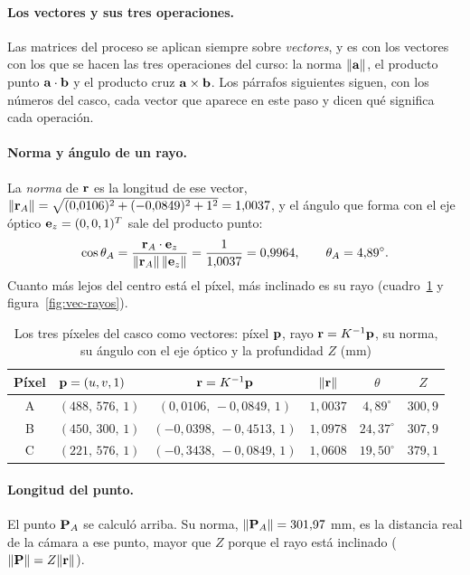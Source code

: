 \paragraph{Los vectores y sus tres operaciones.} Las matrices del proceso se aplican siempre sobre \emph{vectores}, y es con los vectores con los que se hacen las tres operaciones del curso: la norma $\lVert\mathbf{a}\rVert$, el producto punto $\mathbf{a}\cdot\mathbf{b}$ y el producto cruz $\mathbf{a}\times\mathbf{b}$. Los párrafos siguientes siguen, con los números del casco, cada vector que aparece en este paso y dicen qué significa cada operación.

\paragraph{Norma y ángulo de un rayo.} La \emph{norma} de $\mathbf{r}$ es la longitud de ese vector, $\lVert\mathbf{r}_A\rVert=\sqrt{(0{,}0106)^2+(-0{,}0849)^2+1^2}=1{,}0037$, y el ángulo
que forma con el eje óptico $\mathbf{e}_z=(0,0,1)^{T}$ sale del producto punto:
\begin{equation}
\cos\theta_A=\frac{\mathbf{r}_A\cdot\mathbf{e}_z}{\lVert\mathbf{r}_A\rVert\,\lVert\mathbf{e}_z\rVert}=\frac{1}{1{,}0037}=0{,}9964,\qquad \theta_A=4{,}89^\circ .
\end{equation}
Cuanto más lejos del centro está el píxel, más inclinado es su rayo (cuadro~\ref{tab:rayos-casco} y figura~\ref{fig:vec-rayos}).

\begin{table}[htbp]
\caption{Los tres píxeles del casco como vectores: píxel $\mathbf{p}$, rayo $\mathbf{r}=K^{-1}\mathbf{p}$, su norma, su ángulo con el eje óptico y la profundidad $Z$ (mm)}
\label{tab:rayos-casco}
\centering\small
\begin{tabular}{@{}clcccc@{}}
\toprule
Píxel & $\mathbf{p}=(u,v,1)$ & $\mathbf{r}=K^{-1}\mathbf{p}$ & $\lVert\mathbf{r}\rVert$ & $\theta$ & $Z$ \\
\midrule
A & $(488,\,576,\,1)$ & $(0{,}0106,\,-0{,}0849,\,1)$ & $1{,}0037$ & $4{,}89^\circ$ & $300{,}9$ \\
B & $(450,\,300,\,1)$ & $(-0{,}0398,\,-0{,}4513,\,1)$ & $1{,}0978$ & $24{,}37^\circ$ & $307{,}9$ \\
C & $(221,\,576,\,1)$ & $(-0{,}3438,\,-0{,}0849,\,1)$ & $1{,}0608$ & $19{,}50^\circ$ & $379{,}1$ \\
\bottomrule
\end{tabular}
\end{table}

\paragraph{Longitud del punto.} El punto $\mathbf{P}_A$ se calculó arriba. Su norma, $\lVert\mathbf{P}_A\rVert=301{,}97$ mm, es la distancia real de la cámara a ese punto, mayor que $Z$ porque el rayo está inclinado ($\lVert\mathbf{P}\rVert=Z\lVert\mathbf{r}\rVert$).

